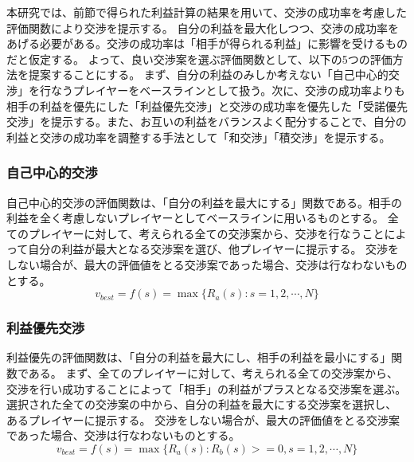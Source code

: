 \documentclass[a4, 10pt,dvipdfmx]{jsarticle}
\begin{document}
本研究では、前節で得られた利益計算の結果を用いて、交渉の成功率を考慮した評価関数により交渉を提示する。
自分の利益を最大化しつつ、交渉の成功率をあげる必要がある。交渉の成功率は「相手が得られる利益」に影響を受けるものだと仮定する。
よって、良い交渉案を選ぶ評価関数として、以下の5つの評価方法を提案することにする。
まず、自分の利益のみしか考えない「自己中心的交渉」を行なうプレイヤーをベースラインとして扱う。次に、交渉の成功率よりも相手の利益を優先にした「利益優先交渉」と交渉の成功率を優先した「受諾優先交渉」を提示する。また、お互いの利益をバランスよく配分することで、自分の利益と交渉の成功率を調整する手法として「和交渉」「積交渉」を提示する。

\subsubsection*{自己中心的交渉}
自己中心的交渉の評価関数は、「自分の利益を最大にする」関数である。相手の利益を全く考慮しないプレイヤーとしてベースラインに用いるものとする。
全てのプレイヤーに対して、考えられる全ての交渉案から、交渉を行なうことによって自分の利益が最大となる交渉案を選び、他プレイヤーに提示する。
交渉をしない場合が、最大の評価値をとる交渉案であった場合、交渉は行なわないものとする。
\begin{equation}
  v_{best} = f(s) = \max \{ R_{a}(s) : s = 1, 2, \cdots, N \}
\end{equation}

\subsubsection*{利益優先交渉} 
利益優先の評価関数は、「自分の利益を最大にし、相手の利益を最小にする」関数である。
まず、全てのプレイヤーに対して、考えられる全ての交渉案から、交渉を行い成功することによって「相手」の利益がプラスとなる交渉案を選ぶ。
選択された全ての交渉案の中から、自分の利益を最大にする交渉案を選択し、あるプレイヤーに提示する。
交渉をしない場合が、最大の評価値をとる交渉案であった場合、交渉は行なわないものとする。
\begin{equation}
  v_{best} = f(s) = \max \{ R_{a}(s) : R_{b}(s) >= 0, s = 1, 2, \cdots, N \}
\end{equation}
\end{document}

